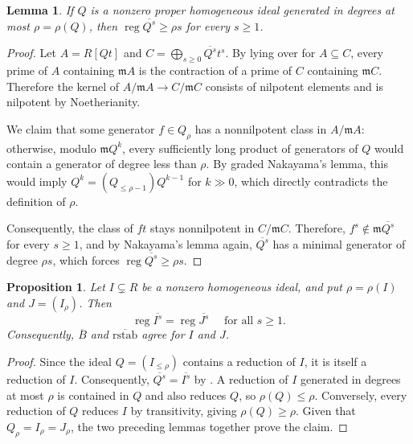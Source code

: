 \documentclass[12pt]{amsart}
\numberwithin{equation}{section}
\newtheorem{lemma}[theorem]{Lemma}
\newtheorem{proposition}[theorem]{Proposition}
\theoremstyle{definition}
\theoremstyle{remark}
\numberwithin{equation}{section}
\DeclareMathOperator{\reg}{reg}
\begin{document}
\begin{lemma}\label{lem:lower}
	If $Q$ is  a  nonzero proper homogeneous ideal generated in degrees at most $\rho=\rho(Q)$, then $\reg\overline{Q^s}\ge\rho s$ for every $s\ge1$.
\end{lemma}
	\begin{proof}
		Let $A = R[Qt]$ and $C = \bigoplus_{s \ge 0} \overline{Q^s}t^s$.  By lying over for $A\subseteq C$, every prime of $A$ containing $\mathfrak m A$ is the contraction of a prime of $C$ containing $\mathfrak m C$. Therefore the kernel of $A/\mathfrak m A\to C/\mathfrak m C$ consists of nilpotent elements and is nilpotent by Noetherianity.
		
	We claim that some generator $f \in Q_\rho$ has a nonnilpotent class in $A/\mathfrak{m}A$: otherwise, modulo $\mathfrak{m}Q^k$, every sufficiently long product of generators of $Q$ would contain a generator of degree less than $\rho$. By graded Nakayama's lemma, this would imply $Q^k = (Q_{\le \rho-1})Q^{k-1}$ for $k \gg 0$, which directly contradicts the definition of $\rho$.
		
		Consequently, the class of $ft$ stays nonnilpotent in $C/\mathfrak{m}C$. Therefore, $f^s \notin \mathfrak{m}\overline{Q^s}$ for every $s \ge 1$, and by Nakayama's lemma again, $\overline{Q^s}$ has a minimal generator of degree $\rho s$, which forces $\reg\overline{Q^s} \ge \rho s$.
	\end{proof}

\begin{proposition}\label{thm:reduction}
	Let $ I \subsetneq R$ be a nonzero  homogeneous ideal, and put $\rho = \rho(I)$ and $J = (I_\rho)$. Then
	\[
	\reg \overline{I^s} = \reg \overline{J^s} \quad \text{ for all $s\ge1$}.
	\]
	Consequently, $\overline{B}$ and $\overline{\mathrm{rstab}}$ agree for $I$ and $J$.
\end{proposition}
\begin{proof}
Since the ideal $Q = (I_{\le \rho})$ contains a reduction of $I$, it is itself a reduction of $I$. Consequently, $\overline{Q^s} = \overline{I^s}$ by \cite{HS}.  A reduction of $I$ generated in degrees at most $\rho$ is contained in $Q$ and also reduces $Q$, so $\rho(Q)\le\rho$. Conversely, every reduction of $Q$ reduces $I$ by transitivity, giving $\rho(Q)\ge\rho$. Given that $Q_\rho = I_\rho = J_\rho$, the two preceding lemmas together prove the claim.
\end{proof}
\end{document}
